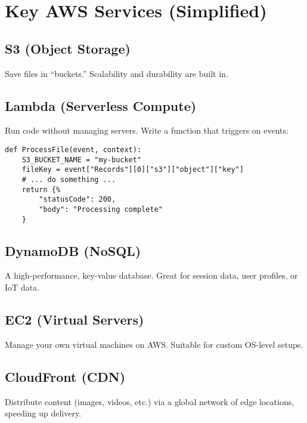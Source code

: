 \documentclass[12pt]{article}
\begin{document}
\clearpage

\section{Key AWS Services (Simplified)}
\justifying

\subsection{S3 (Object Storage)}
Save files in “buckets.” Scalability and durability are built in.

\subsection{Lambda (Serverless Compute)}
Run code without managing servers. Write a function that triggers on events:

\begin{verbatim}
def ProcessFile(event, context):
    S3_BUCKET_NAME = "my-bucket"
    fileKey = event["Records"][0]["s3"]["object"]["key"]
    # ... do something ...
    return {%
        "statusCode": 200,
        "body": "Processing complete"
    }
\end{verbatim}

\subsection{DynamoDB (NoSQL)}
A high-performance, key-value database. Great for session data, user profiles, or IoT data.

\subsection{EC2 (Virtual Servers)}
Manage your own virtual machines on AWS. Suitable for custom OS-level setups.

\subsection{CloudFront (CDN)}
Distribute content (images, videos, etc.) via a global network of edge locations, speeding up delivery.

\clearpage

\end{document}
